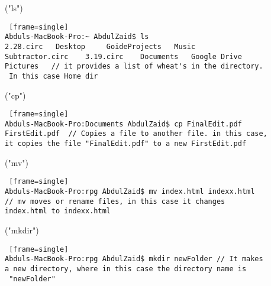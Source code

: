 \documentclass[12pt, oneside]{amsart}   	%
\begin{document}
 ("ls")
 \begin{lstlisting} [frame=single]
Abduls-MacBook-Pro:~ AbdulZaid$ ls
2.28.circ	Desktop		GoideProjects	Music
Subtractor.circ    3.19.circ	Documents	Google Drive
Pictures   // it provides a list of wheat's in the directory.
 In this case Home dir
\end{lstlisting} 

("cp")
 \begin{lstlisting} [frame=single]
Abduls-MacBook-Pro:Documents AbdulZaid$ cp FinalEdit.pdf 
FirstEdit.pdf  // Copies a file to another file. in this case,
it copies the file "FinalEdit.pdf" to a new FirstEdit.pdf
\end{lstlisting} 

("mv")
 \begin{lstlisting} [frame=single]
Abduls-MacBook-Pro:rpg AbdulZaid$ mv index.html indexx.html
// mv moves or rename files, in this case it changes
index.html to indexx.html
\end{lstlisting} 


("mkdir")
 \begin{lstlisting} [frame=single]
Abduls-MacBook-Pro:rpg AbdulZaid$ mkdir newFolder // It makes
a new directory, where in this case the directory name is
 "newFolder"
\end{lstlisting} 
\end{document}

